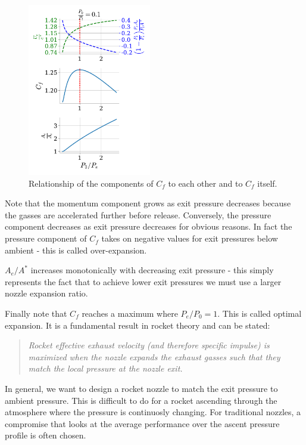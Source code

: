 \documentclass[twocolumn]{memoir} %
\begin{document}
\begin{figure}[H]
    \includegraphics[width=0.48\textwidth]{Cf_5_7}
    \caption{Relationship of the components of $C_f$ to each other and to $C_f$ itself.}
\end{figure}

Note that the momentum component grows as exit pressure decreases because the gasses are accelerated further before release.  Conversely, the pressure component decreases as exit pressure decreases for obvious reasons.  In fact the pressure component of $C_f$ takes on negative values for exit pressures below ambient - this is called over-expansion.

$A_e/A^*$ increases monotonically with decreasing exit pressure - this simply represents the fact that to achieve lower exit pressures we must use a larger nozzle expansion ratio.

Finally note that \(C_f\) reaches a maximum where \(P_e/P_0 = 1\). This
is called optimal expansion. It is a fundamental result in rocket theory
and can be stated:

\begin{quote}
    \emph{Rocket effective exhaust velocity (and therefore specific impulse) is
maximized when the nozzle expands the exhaust gasses such that they
    match the local pressure at the nozzle exit.}
\end{quote}

In general, we want to design a rocket nozzle to match
the exit pressure to ambient pressure. This is difficult to do for a
rocket ascending through the atmosphere where the pressure is
continuosly changing. For traditional nozzles, a compromise that looks
at the average performance over the ascent pressure profile is often
chosen.
\end{document}
